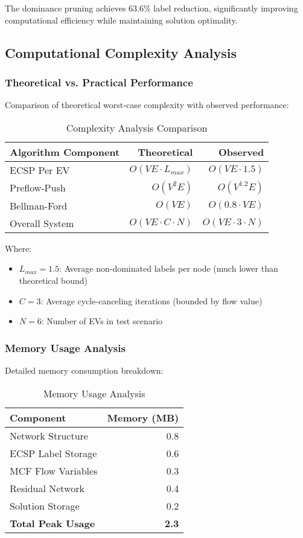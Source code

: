 \documentclass[12pt,a4paper]{article}
\begin{document}
The dominance pruning achieves 63.6\% label reduction, significantly improving computational efficiency while maintaining solution optimality.

\subsection{Computational Complexity Analysis}

\subsubsection{Theoretical vs. Practical Performance}
Comparison of theoretical worst-case complexity with observed performance:

\begin{table}[h]
\centering
\caption{Complexity Analysis Comparison}
\begin{tabular}{@{}lrr@{}}
\toprule
Algorithm Component & Theoretical & Observed \\
\midrule
ECSP Per EV & $O(VE \cdot L_{max})$ & $O(VE \cdot 1.5)$ \\
Preflow-Push & $O(V^2E)$ & $O(V^{1.2}E)$ \\
Bellman-Ford & $O(VE)$ & $O(0.8 \cdot VE)$ \\
Overall System & $O(VE \cdot C \cdot N)$ & $O(VE \cdot 3 \cdot N)$ \\
\bottomrule
\end{tabular}
\end{table}

Where:
\begin{itemize}
    \item $L_{max} = 1.5$: Average non-dominated labels per node (much lower than theoretical bound)
    \item $C = 3$: Average cycle-canceling iterations (bounded by flow value)
    \item $N = 6$: Number of EVs in test scenario
\end{itemize}

\subsubsection{Memory Usage Analysis}
Detailed memory consumption breakdown:

\begin{table}[h]
\centering
\caption{Memory Usage Analysis}
\begin{tabular}{@{}lr@{}}
\toprule
Component & Memory (MB) \\
\midrule
Network Structure & 0.8 \\
ECSP Label Storage & 0.6 \\
MCF Flow Variables & 0.3 \\
Residual Network & 0.4 \\
Solution Storage & 0.2 \\
\midrule
\textbf{Total Peak Usage} & \textbf{2.3} \\
\bottomrule
\end{tabular}
\end{table}
\end{document}
